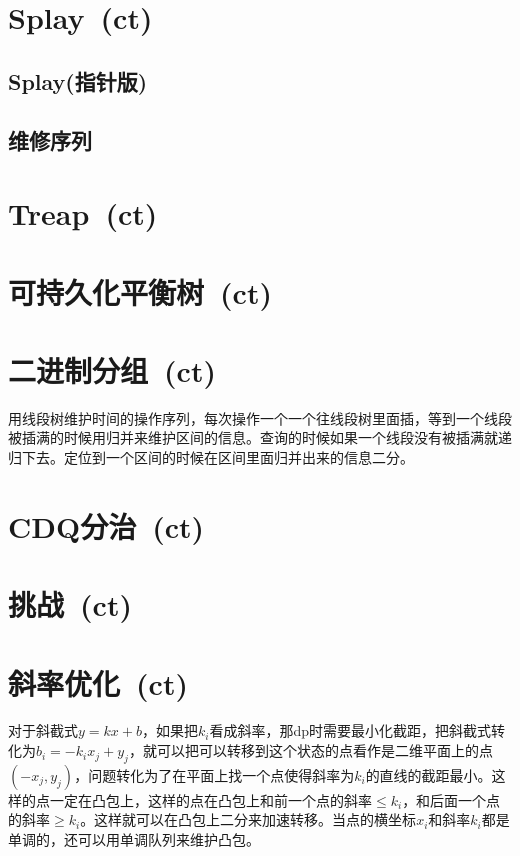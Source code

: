 \section{Splay~\small(ct)}
    \subsection*{Splay(指针版)}
    \subsection*{维修序列}

\section{Treap~\small(ct)}

\section{可持久化平衡树~\small(ct)}

\section{二进制分组~\small(ct)}
    用线段树维护时间的操作序列，每次操作一个一个往线段树里面插，等到一个线段被插满的时候用归并来维护区间的信息。查询的时候如果一个线段没有被插满就递归下去。定位到一个区间的时候在区间里面归并出来的信息二分。

\section{CDQ分治~\small(ct)}

\section{挑战~\small(ct)}

\section{斜率优化~\small(ct)}
    对于斜截式$ y = k x + b $，如果把$ k_i $看成斜率，那dp时需要最小化截距，把斜截式转化为$ b_i = - k_i x_j + y_j $，就可以把可以转移到这个状态的点看作是二维平面上的点$ (- x_j, y_j) $，问题转化为了在平面上找一个点使得斜率为$ k_i $的直线的截距最小。这样的点一定在凸包上，这样的点在凸包上和前一个点的斜率$ \leq k_i$，和后面一个点的斜率$ \geq k_i $。这样就可以在凸包上二分来加速转移。当点的横坐标$ x_i $和斜率$ k_i $都是单调的，还可以用单调队列来维护凸包。
